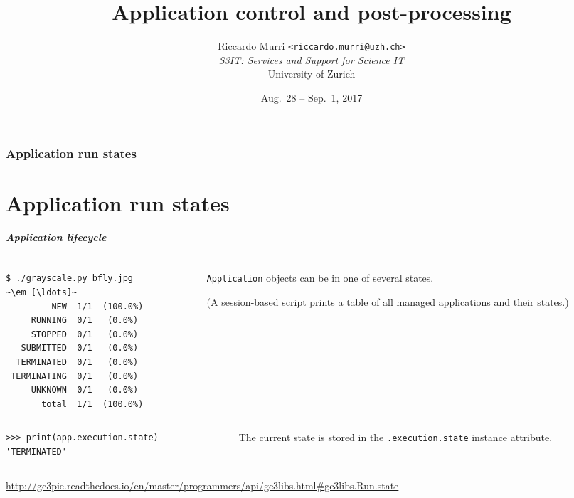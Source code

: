 \documentclass[english,serif,mathserif,xcolor=pdftex,dvipsnames,table]{beamer}
\title[Post-processing]{%
  Application control and post-processing
}
\author[R. Murri, S3IT UZH]{%
  Riccardo Murri \texttt{<riccardo.murri@uzh.ch>}
  \\[1ex]
  \emph{S3IT: Services and Support for Science IT}
  \\[1ex]
  University of Zurich
}
\date{Aug.~28 -- Sep.~1, 2017}
\begin{document}
\maketitle


\section{Application run states}
\part{Application run states}

\begin{frame}[fragile]
\frametitle{Application lifecycle}

\begin{columns}[c]
  \begin{column}{0.5\textwidth}
\begin{lstlisting}[basicstyle=\footnotesize\ttfamily,keywordstyle=\normalfont]
$ ./grayscale.py bfly.jpg
~\em [\ldots]~
         NEW  1/1  (100.0%)
     RUNNING  0/1   (0.0%)
     STOPPED  0/1   (0.0%)
   SUBMITTED  0/1   (0.0%)
  TERMINATED  0/1   (0.0%)
 TERMINATING  0/1   (0.0%)
     UNKNOWN  0/1   (0.0%)
       total  1/1  (100.0%)
\end{lstlisting}%
  \end{column}
  \begin{column}{0.5\textwidth}
    \raggedleft
    \texttt{Application} objects can be in one of several states.

    \+
    (A session-based script prints a table of all managed applications and their states.)
  \end{column}
\end{columns}

\+
\begin{columns}[c]
  \begin{column}{0.5\textwidth}
\begin{lstlisting}[basicstyle=\footnotesize\ttfamily]
>>> print(app.execution.state)
'TERMINATED'
\end{lstlisting}
  \end{column}
  \begin{column}{0.5\textwidth}
    \raggedleft
    The current state is stored in the \texttt{.execution.state} instance attribute.
  \end{column}
\end{columns}

\+
\begin{references}
  \tiny
  \url{http://gc3pie.readthedocs.io/en/master/programmers/api/gc3libs.html#gc3libs.Run.state}
\end{references}
\end{frame}
\end{document}
